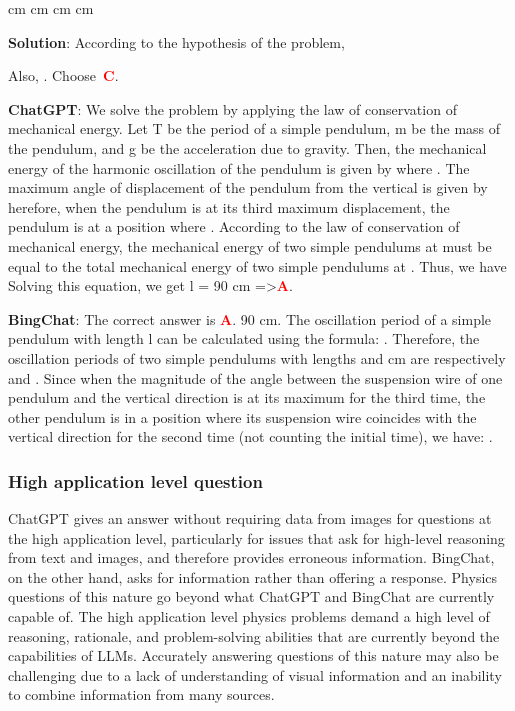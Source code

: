 \documentclass{article}
\begin{document}
{\begin{mdframed}[linewidth=1pt,linecolor=red]
		\begin{oneparchoices}
			 cm
			 cm
			 cm
			 cm
		\end{oneparchoices}
		
		\textbf{Solution}: According to the hypothesis of the problem,	
		
		Also,
		. Choose~\textcolor{red}{\textbf{C}}. 
		
		\textbf{ChatGPT}: We solve the problem by applying the law of conservation of mechanical energy. Let T be the period of a simple pendulum, m be the mass of the pendulum, and g be the acceleration due to gravity. Then, the mechanical energy of the harmonic oscillation of the pendulum is given by where .
		The maximum angle of displacement of the pendulum from the vertical is given by 
		herefore, when the pendulum is at its third maximum displacement, the pendulum is at a position where .
		According to the law of conservation of mechanical energy, the mechanical energy of two simple pendulums at  must be equal to the total mechanical energy of two simple pendulums at .
		Thus, we have 
		Solving this equation, we get l = 90 cm =>\textcolor{red}{\textbf{A}}.
		
		\textbf{BingChat}: The correct answer is \textcolor{red}{\textbf{A}}. 90 cm. The oscillation period of a simple pendulum with length l can be calculated using the formula: . Therefore, the oscillation periods of two simple pendulums with lengths  and  cm are respectively  and . Since when the magnitude of the angle between the suspension wire of one pendulum and the vertical direction is at its maximum for the third time, the other pendulum is in a position where its suspension wire coincides with the vertical direction for the second time (not counting the initial time), we have: .
		
	\end{mdframed}	
	
	\subsubsection{High application level question}
	
	\label{VNHSGE_Phy_H}
	
	ChatGPT gives an answer without requiring data from images for questions at the high application level, particularly for issues that ask for high-level reasoning from text and images, and therefore provides erroneous information. BingChat, on the other hand, asks for information rather than offering a response. Physics questions of this nature go beyond what ChatGPT and BingChat are currently capable of. The high application level physics problems demand a high level of reasoning, rationale, and problem-solving abilities that are currently beyond the capabilities of LLMs. Accurately answering questions of this nature may also be challenging due to a lack of understanding of visual information and an inability to combine information from many sources.
	
}
\end{document}
